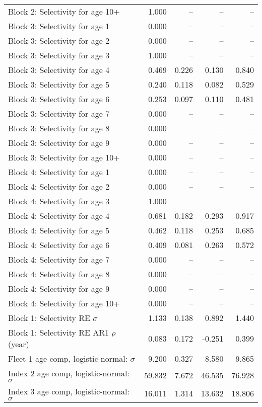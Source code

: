 \documentclass[
]{article}
\begin{document}
\begin{landscape}
\begin{longtable}[t]{lrrrr}
\addlinespace
Block 2: Selectivity for age 10+ & 1.000 & -- & -- & --\\
Block 3: Selectivity for age 1 & 0.000 & -- & -- & --\\
Block 3: Selectivity for age 2 & 0.000 & -- & -- & --\\
Block 3: Selectivity for age 3 & 1.000 & -- & -- & --\\
Block 3: Selectivity for age 4 & 0.469 & 0.226 & 0.130 & 0.840\\
\addlinespace
Block 3: Selectivity for age 5 & 0.240 & 0.118 & 0.082 & 0.529\\
Block 3: Selectivity for age 6 & 0.253 & 0.097 & 0.110 & 0.481\\
Block 3: Selectivity for age 7 & 0.000 & -- & -- & --\\
Block 3: Selectivity for age 8 & 0.000 & -- & -- & --\\
Block 3: Selectivity for age 9 & 0.000 & -- & -- & --\\
\addlinespace
Block 3: Selectivity for age 10+ & 0.000 & -- & -- & --\\
Block 4: Selectivity for age 1 & 0.000 & -- & -- & --\\
Block 4: Selectivity for age 2 & 0.000 & -- & -- & --\\
Block 4: Selectivity for age 3 & 1.000 & -- & -- & --\\
Block 4: Selectivity for age 4 & 0.681 & 0.182 & 0.293 & 0.917\\
\addlinespace
Block 4: Selectivity for age 5 & 0.462 & 0.118 & 0.253 & 0.685\\
Block 4: Selectivity for age 6 & 0.409 & 0.081 & 0.263 & 0.572\\
Block 4: Selectivity for age 7 & 0.000 & -- & -- & --\\
Block 4: Selectivity for age 8 & 0.000 & -- & -- & --\\
Block 4: Selectivity for age 9 & 0.000 & -- & -- & --\\
\addlinespace
Block 4: Selectivity for age 10+ & 0.000 & -- & -- & --\\
Block 1: Selectivity RE $\sigma$ & 1.133 & 0.138 & 0.892 & 1.440\\
Block 1: Selectivity RE AR1 $\rho$ (year) & 0.083 & 0.172 & -0.251 & 0.399\\
Fleet 1 age comp, logistic-normal: $\sigma$ & 9.200 & 0.327 & 8.580 & 9.865\\
Index 2 age comp, logistic-normal: $\sigma$ & 59.832 & 7.672 & 46.535 & 76.928\\
\addlinespace
Index 3 age comp, logistic-normal: $\sigma$ & 16.011 & 1.314 & 13.632 & 18.806\\*
\end{longtable}
\end{landscape}
\end{document}
